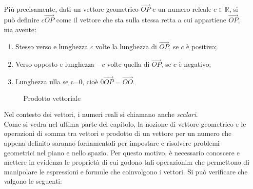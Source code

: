 \documentclass{book}
\theoremstyle{definition}
\theoremstyle{plain}
\begin{document}
Più precisamente, dati un vettore geometrico $\vec{OP}$ e un numero releale $c\in\mathds{R}$, si può definire $c\vec{OP}$ come il vettore che sta sulla stessa retta a cui appartiene $\vec{OP}$, ma avente:
\begin{enumerate}
\item Stesso verso e lunghezza $c$ volte la lunghezza di $\vec{OP}$, se $c$ è positivo;
\item Verso opposto e lunghezza $-c$ volte quella di $\vec{OP}$, se $c$ è negativo;
\item Lunghezza ulla se c=0, cioè $0\vec{OP}=\vec{OO}$.
\end{enumerate}
\begin{figure}[ht!]
  \centering
  \resizebox{6cm}{!}{
      
    }
  \caption{Prodotto vettoriale}
  \label{fig:prodottovect}
\end{figure}
Nel contesto dei vettori, i numeri reali si chiamano anche \textit{scalari}.\\
Come si vedra nel ultima parte del capitolo, la nozione di vettore geometrico e le operazioni di somma tra vettori e prodotto di un vettore per un numero che appena definito saranno fornamentali per impostare e risolvere problemi geometrici nel piano e nello spazio. Per questo motivo, è necessario conoscere e mettere in evidenza le proprietà di cui godono tali operazionim che permettono di manipolare le espressioni e formule che coinvolgono i vettori. Si può verificare che valgono le seguenti:
\end{document}
